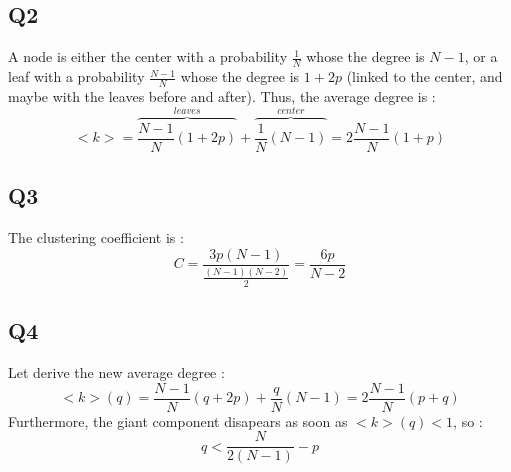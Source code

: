 \documentclass[a4paper]{report}
\begin{document}
\subsection*{Q2}

A node is either the center with a probability $\frac{1}{N}$ whose the degree is $N-1$, or a leaf with a probability $\frac{N-1}{N}$ whose the degree is $1+2p$ (linked to the center, and maybe with the leaves before and after). Thus, the average degree is :
\[<k>=\overbrace{\frac{N-1}{N}(1+2p)}^{leaves}+\overbrace{\frac{1}{N}(N-1)}^{center}=2\frac{N-1}{N}(1+p)\]

\subsection*{Q3}
The clustering coefficient is :
\[C=\frac{3p(N-1)}{\frac{(N-1)(N-2)}{2}}=\frac{6p}{N-2}\]
\subsection*{Q4}
Let derive the new average degree :
\[<k>(q)=\frac{N-1}{N}(q+2p)+\frac{q}{N}(N-1)=2\frac{N-1}{N}(p+q)\]
Furthermore, the giant component disapears as soon as $<k>(q)<1$, so :
\[q<\frac{N}{2(N-1)}-p\]
\end{document}
